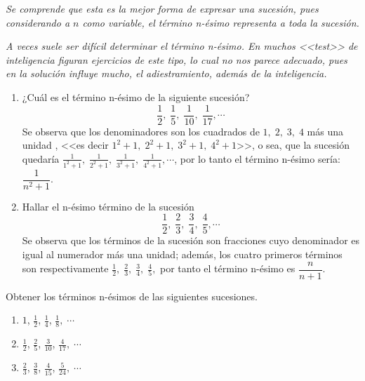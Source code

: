 \documentclass[oneside,english,spanish,2m,twoside,svgnames,x11names,HTML,twoside,12pt]{libro-matua}\usepackage[]{graphicx}\usepackage[]{color}
\begin{document}
\textsl{\small{}Se comprende que esta es la mejor forma de expresar
una sucesión, pues considerando a $n$ como variable, el término n-ésimo
representa a toda la sucesión.}{\small \par}

\textsl{\small{}A veces suele ser difícil determinar el término n-ésimo.
En muchos <<test>> de inteligencia figuran ejercicios de este tipo,
lo cual no nos parece adecuado, pues en la solución influye mucho,
el adiestramiento, además de la inteligencia.}{\small \par}

\begin{ejemplos}\label{ej:n-esimo}
\begin{enumerate}
\item ¿Cuál es el término n-ésimo de la siguiente sucesión?
\[
\frac{1}{2},\;\frac{1}{5},\;\frac{1}{10},\;\frac{1}{17},\cdots
\]
 \sol Se observa que los denominadores son los cuadrados de $1,\;2,\;3,\;4$
más una unidad , <<es decir $1^{2}+1,\;2^{2}+1,\;3^{2}+1,\;4^{2}+1$>>,
o sea, que la sucesión quedaría $\frac{1}{1^{2}+1},\;\frac{1}{2^{2}+1},\;\frac{1}{3^{2}+1},\;\frac{1}{4^{2}+1},\cdots$,
por lo tanto el término n-ésimo sería: $\dfrac{1}{n^{2}+1}.$ \fin
\item Hallar el n-ésimo término de la sucesión 
\[
\frac{1}{2},\;\frac{2}{3},\;\frac{3}{4},\;\frac{4}{5},\cdots
\]
\sol Se observa que los términos de la sucesión son fracciones cuyo
denominador es igual al numerador más una unidad; además, los cuatro
primeros términos son respectivamente $\frac{1}{2},\;\frac{2}{3},\;\frac{3}{4},\;\frac{4}{5},$
por tanto el término n-ésimo es $\dfrac{n}{n+1}.$ \fin
\end{enumerate}
\end{ejemplos}

\begin{ejercicios}[]

Obtener los términos n-ésimos de las siguientes sucesiones.

\doublespacing
\begin{enumerate}
\item $1$, $\frac{1}{2}$, $\frac{1}{4}$, $\frac{1}{8},\;\cdots$
\item $\frac{1}{2}$, $\frac{2}{5}$, $\frac{3}{10}$, $\frac{4}{17},\;\cdots$
\item $\frac{2}{3}$, $\frac{3}{8}$, $\frac{4}{15}$, $\frac{5}{24},\;\cdots$
\end{enumerate}
\end{ejercicios}
\end{document}
